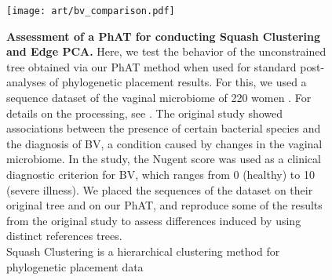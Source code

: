 \begin{figure}[hpbt]
    \centering
    \texttt{[image: art/bv\_comparison.pdf]}
    \vspace*{-1em}
    \begin{subfigure}{0pt}
        \label{fig:bv_comparison:sub:squash_art}
    \end{subfigure}
    \begin{subfigure}{0pt}
        \label{fig:bv_comparison:sub:squash_orig}
    \end{subfigure}
    \begin{subfigure}{0pt}
        \label{fig:bv_comparison:sub:edgepca_art}
    \end{subfigure}
    \begin{subfigure}{0pt}
        \label{fig:bv_comparison:sub:edgepca_orig}
    \end{subfigure}
    \caption[Assessment of a \ac{PhAT} for conducting Squash Clustering and Edge PCA]{
        \small
        \textbf{Assessment of a \ac{PhAT} for conducting Squash Clustering and Edge PCA.}
        Here, we test the behavior of the unconstrained  tree obtained via our \ac{PhAT} method
        when used for standard post-analyses of phylogenetic placement results.
        For this, we used a sequence dataset of the vaginal microbiome of 220 women \citep{Srinivasan2012}.
        For details on the processing, see .
        The original study showed associations between the presence of certain bacterial species
        and the diagnosis of \acf{BV}, a condition caused by changes in the vaginal microbiome.
        In the study, the Nugent score \citep{Nugent1991} was used as a clinical diagnostic criterion for \ac{BV},
        which ranges from \num{0} (healthy) to \num{10} (severe illness).
        We placed the sequences of the dataset on their original tree and on our \ac{PhAT},
        and reproduce some of the results from the original study
        to assess differences induced by using distinct references trees.
        \\
        Squash Clustering is a hierarchical clustering method for phylogenetic placement data \citep{Matsen2011a} %
}
\end{figure}
